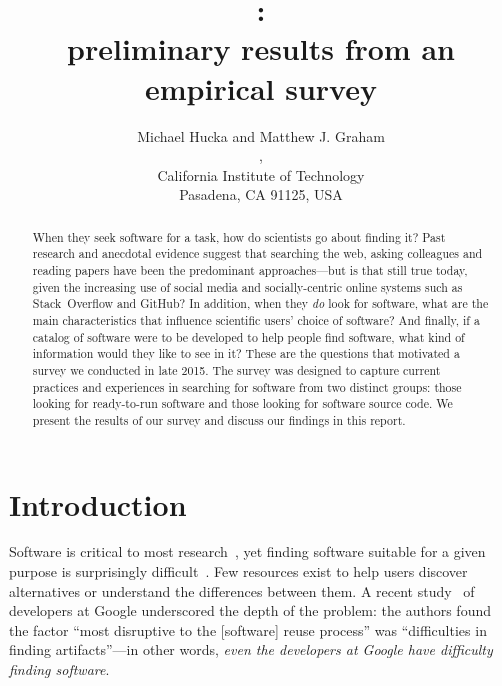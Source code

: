 \documentclass{casicswhitepaper}
\begin{document}
\title{\vspace*{-2ex}:\\
preliminary results from an empirical survey}
\date{\dateAndVersion}
\author{Michael Hucka and Matthew J. Graham\\
,\quad{}\\
California Institute of Technology\\
Pasadena, CA 91125, USA}
\maketitle

\begin{abstract}
When they seek software for a task, how do scientists go about finding it?  Past research and anecdotal evidence suggest that searching the web, asking colleagues and reading papers have been the predominant approaches---but is that still true today, given the increasing use of social media and socially-centric online systems such as Stack~Overflow and GitHub?  In addition, when they \emph{do} look for software, what are the main characteristics that influence scientific users' choice of software?  And finally, if a catalog of software were to be developed to help people find software, what kind of information would they like to see in it?  These are the questions that motivated a survey we conducted in late 2015.  The survey was designed to capture current practices and experiences in searching for software from two distinct groups: those looking for ready-to-run software and those looking for software source code.  We present the results of our survey and discuss our findings in this report.
\end{abstract}


\section{Introduction}

Software is critical to most research~, yet finding software suitable for a given purpose is surprisingly difficult~\cite{cannata_2005, Bourne::2015, SoftwareDiscoveryIndex:2014}.  Few resources exist to help users discover alternatives or understand the differences between them.  A recent study~\cite{bauer2014exploratory} of developers at Google underscored the depth of the problem: the authors found the factor ``most disruptive to the [software] reuse process'' was ``difficulties in finding artifacts''---in other words, \emph{even the developers at Google have difficulty finding software}.
\end{document}
